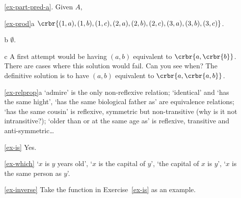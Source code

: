 \documentclass[11pt]{article}
\begin{document}
\begin{enumerate}
\ref{ex-part-pred-a}. Given $A$, 

\item[\ref{ex-prod}a]
$\crbr{(1,a),(1,b),(1,c),(2,a),(2,b),(2,c),(3,a),(3,b),(3,c)}$.
\item[b] $\emptyset$.
\item[c] A first attempt would be having $(a,b)$ equivalent to
$\crbr{a,\crbr{b}}$. There are cases where this solution would fail. Can you see
when? The definitive solution is to have $(a,b)$ equivalent to
$\crbr{a,\crbr{a,b}}$.

\item[\ref{ex-relprop}a] `admire' is the only non-reflexive relation; `identical'
and `has the same hight', `has the same biological father as'  are equivalence
relations; `has the same cousin' is reflexive, symmetric but non-transitive (why
is it not intransitive?); `older than or at the same age as' is reflexive,
transitive and anti-symmetric\ldots

\item[\ref{ex-is}] Yes.

\item[\ref{ex-which}]
 `$x$ is $y$ years old',
`$x$ is the capital of $y$', `the capital  of $x$ is $y$', `$x$ is the same person as $y$'.


\item[\ref{ex-inverse}] Take the function in Exercise~\ref{ex-is} as an example.


\end{enumerate}
\end{document}
